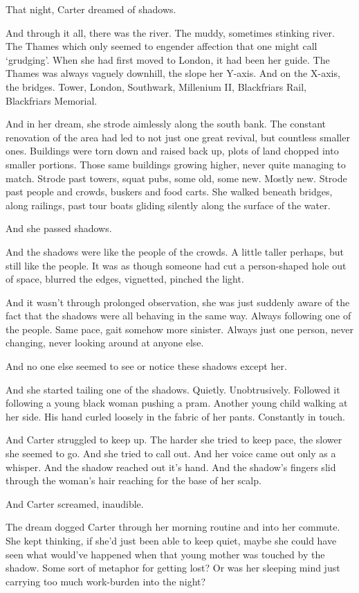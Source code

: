 That night, Carter dreamed of shadows.

And through it all, there was the river. The muddy, sometimes stinking river. The Thames which only seemed to engender affection that one might call `grudging'. When she had first moved to London, it had been her guide. The Thames was always vaguely downhill, the slope her Y-axis. And on the X-axis, the bridges. Tower, London, Southwark, Millenium II, Blackfriars Rail, Blackfriars Memorial.

And in her dream, she strode aimlessly along the south bank. The constant renovation of the area had led to not just one great revival, but countless smaller ones. Buildings were torn down and raised back up, plots of land chopped into smaller portions. Those same buildings growing higher, never quite managing to match. Strode past towers, squat pubs, some old, some new. Mostly new. Strode past people and crowds, buskers and food carts. She walked beneath bridges, along railings, past tour boats gliding silently along the surface of the water.

And she passed shadows.

And the shadows were like the people of the crowds. A little taller perhaps, but still like the people. It was as though someone had cut a person-shaped hole out of space, blurred the edges, vignetted, pinched the light.

And it wasn't through prolonged observation, she was just suddenly aware of the fact that the shadows were all behaving in the same way. Always following one of the people. Same pace, gait somehow more sinister. Always just one person, never changing, never looking around at anyone else.

And no one else seemed to see or notice these shadows except her.

And she started tailing one of the shadows. Quietly. Unobtrusively. Followed it following a young black woman pushing a pram. Another young child walking at her side. His hand curled loosely in the fabric of her pants. Constantly in touch.

And Carter struggled to keep up. The harder she tried to keep pace, the slower she seemed to go. And she tried to call out. And her voice came out only as a whisper. And the shadow reached out it's hand. And the shadow's fingers slid through the woman's hair reaching for the base of her scalp.

And Carter screamed, inaudible.

The dream dogged Carter through her morning routine and into her commute. She kept thinking, if she'd just been able to keep quiet, maybe she could have seen what would've happened when that young mother was touched by the shadow. Some sort of metaphor for getting lost? Or was her sleeping mind just carrying too much work-burden into the night?

